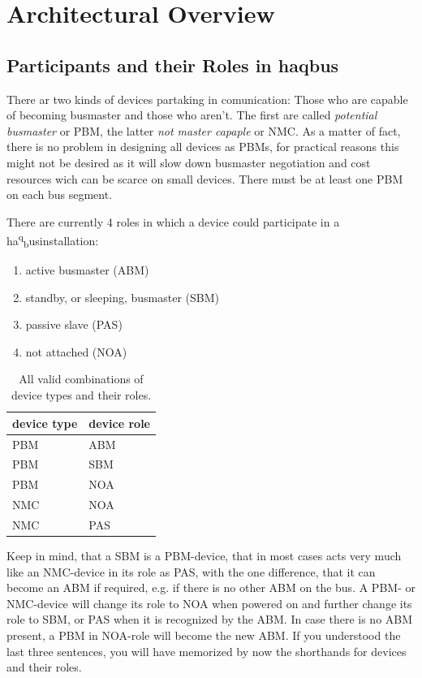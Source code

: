 \documentclass[a4paper,12pt]{scrartcl}
\newcommand{\haqbus}{ha\textsuperscript{q}\textsubscript{b}us}
\begin{document}
\section{Architectural Overview}
\subsection{Participants and their Roles in haqbus}
There ar two kinds of devices partaking in comunication: Those who are capable of becoming busmaster and those who aren't.
The first are called \emph{potential busmaster} or PBM, the latter \emph{not master capaple} or NMC.
As a matter of fact, there is no problem in designing all devices as PBMs, for practical reasons this might not be desired as it will
slow down busmaster negotiation and cost resources wich can be scarce on small devices. 
There must be at least one PBM on each bus segment.

There are currently 4 roles in which a device could participate in a \haqbus installation:
\begin{enumerate}
\item active busmaster (ABM)
\item standby, or sleeping, busmaster (SBM)
\item passive slave (PAS)
\item not attached (NOA) 
\end{enumerate}

\begin{table}
  \centering
    \begin{tabular}{|l|l|}
        \hline
        device type & device role \\ \hline
        PBM         & ABM         \\ 
        PBM         & SBM         \\ 
        PBM         & NOA         \\
        NMC         & NOA     \\
        NMC         & PAS         \\
        	 
        \hline
    \end{tabular}
    \caption{%
    All valid combinations of device types and their roles.    
    }
\end{table}

Keep in mind, that a SBM is a PBM-device, that in most cases acts very much like an NMC-device in its role as PAS, with the one difference,
that it can become an ABM if required, e.g. if there is no other ABM on the bus.
A PBM- or NMC-device will change its role to NOA when powered on and further change its role to SBM, or PAS when it is recognized by the ABM.
In case there is no ABM present, a PBM in NOA-role will become the new ABM.
If you understood the last three sentences, you will have memorized by now the shorthands for devices and their roles.
\end{document}
